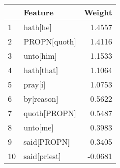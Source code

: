 \begin{tabular}{llr}
\toprule
{} &       Feature &  Weight \\
\midrule
1  &      hath[he] &  1.4557 \\
2  &  PROPN[quoth] &  1.4116 \\
3  &     unto[him] &  1.1533 \\
4  &    hath[that] &  1.1064 \\
5  &       pray[i] &  1.0753 \\
6  &    by[reason] &  0.5622 \\
7  &  quoth[PROPN] &  0.5487 \\
8  &      unto[me] &  0.3983 \\
9  &   said[PROPN] &  0.3405 \\
10 &  said[priest] & -0.0681 \\
\bottomrule
\end{tabular}
